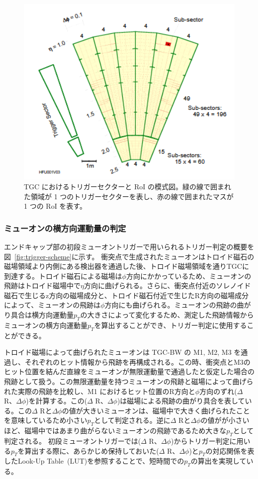 \begin{figure}[tb]
  \centering
  \includegraphics[clip, width=13cm]{fig/3/RoI.png}
  \caption{TGC におけるトリガーセクターと RoI の模式図。緑の線で囲まれた領域が 1 つのトリガーセクターを表し、赤の線で囲まれたマスが 1 つの RoI を表す。}
  \label{fig:RoI}
\end{figure}


\subsubsection{ミューオンの横方向運動量の判定}
エンドキャップ部の初段ミューオントリガーで用いられるトリガー判定の概要を図~\ref{fig:trigger-scheme}に示す。
衝突点で生成されたミューオンはトロイド磁石の磁場領域より内側にある検出器を通過した後、トロイド磁場領域を通りTGCに到達する。トロイド磁石による磁場は$\phi$方向にかかっているため、ミューオンの飛跡はトロイド磁場中で$\eta$方向に曲げられる。さらに、衝突点付近のソレノイド磁石で生じるz方向の磁場成分と、トロイド磁石付近で生じたR方向の磁場成分によって、ミューオンの飛跡は$\phi$方向にも曲げられる。ミューオンの飛跡の曲がり具合は横方向運動量$p_T$の大きさによって変化するため、測定した飛跡情報からミューオンの横方向運動量$p_T$を算出することができ、トリガー判定に使用することができる。

トロイド磁場によって曲げられたミューオンは TGC-BW の M1, M2, M3 を通過し、それぞれのヒット情報から飛跡を再構成される。この時、衝突点とM3のヒット位置を結んだ直線をミューオンが無限運動量で通過したと仮定した場合の飛跡として扱う。この無限運動量を持つミューオンの飛跡と磁場によって曲げられた実際の飛跡を比較し、M1 におけるヒット位置のR方向と$\phi$方向のずれ($\Delta$ R、$\Delta \phi$)を計算する。この($\Delta$ R、$\Delta \phi$)は磁場による飛跡の曲がり具合を表している。この$\Delta$ Rと$\Delta \phi$の値が大きいミューオンは、磁場中で大きく曲げられたことを意味しているため小さい$p_T$として判定される。逆に$\Delta$ Rと$\Delta \phi$の値がが小さいほど、磁場中ではあまり曲がらないミューオンの飛跡であるため大きな$p_T$として判定される。
初段ミューオントリガーでは($\Delta$ R、$\Delta \phi$)からトリガー判定に用いる$p_T$を算出する際に、あらかじめ保持しておいた($\Delta$ R、$\Delta \phi$)と$p_T$の対応関係を表したLook-Up Table~(LUT)を参照することで、短時間での$p_T$の算出を実現している。

